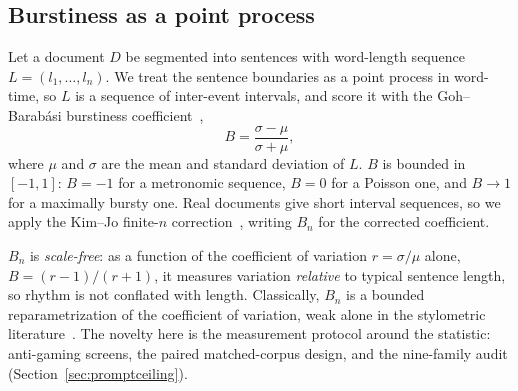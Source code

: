 \documentclass{article}
\begin{document}
\subsection{Burstiness as a point process}
Let a document $D$ be segmented into sentences with word-length sequence $L = (l_1, \dots, l_n)$. We
treat the sentence boundaries as a point process in word-time, so $L$ is a sequence of inter-event
intervals, and score it with the Goh--Barab\'asi burstiness coefficient~\citep{goh2008burstiness},
\[
B = \frac{\sigma - \mu}{\sigma + \mu},
\]
where $\mu$ and $\sigma$ are the mean and standard deviation of $L$. $B$ is bounded in $[-1, 1]$:
$B = -1$ for a metronomic sequence, $B = 0$ for a Poisson one, and $B \to 1$ for
a maximally bursty one. Real documents give short interval sequences, so we apply the Kim--Jo
finite-$n$ correction~\citep{kim2016measuring}, writing $B_n$ for the corrected coefficient.

$B_n$ is \emph{scale-free}: as a function of the coefficient of variation $r = \sigma / \mu$ alone,
$B = (r-1)/(r+1)$, it measures variation \emph{relative} to typical sentence length, so rhythm is not
conflated with length. Classically, $B_n$ is a bounded reparametrization of the coefficient of
variation, weak alone in the stylometric literature~\citep{yule1939sentence, williams1940note}.
The novelty here is the measurement protocol around the statistic: anti-gaming
screens, the paired matched-corpus design, and the nine-family audit
(Section~\ref{sec:promptceiling}).
\end{document}
